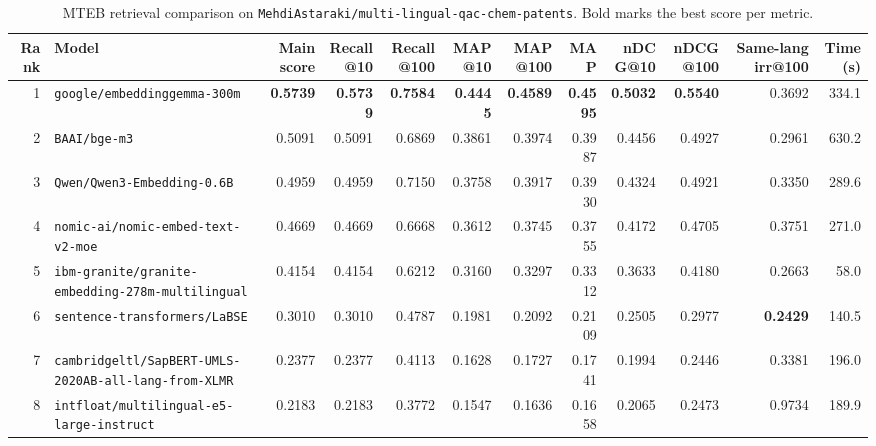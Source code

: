 \begin{table}[t]
\centering
\small
\begin{tabular}{r l r r r r r r r r r r}
\hline
Rank & Model & Main score & Recall@10 & Recall@100 & MAP@10 & MAP@100 & MAP & nDCG@10 & nDCG@100 & Same-lang irr@100 & Time (s) \\
\hline
1 & \texttt{google/embeddinggemma-300m} & \textbf{0.5739} & \textbf{0.5739} & \textbf{0.7584} & \textbf{0.4445} & \textbf{0.4589} & \textbf{0.4595} & \textbf{0.5032} & \textbf{0.5540} & 0.3692 & 334.1 \\
2 & \texttt{BAAI/bge-m3} & 0.5091 & 0.5091 & 0.6869 & 0.3861 & 0.3974 & 0.3987 & 0.4456 & 0.4927 & 0.2961 & 630.2 \\
3 & \texttt{Qwen/Qwen3-Embedding-0.6B} & 0.4959 & 0.4959 & 0.7150 & 0.3758 & 0.3917 & 0.3930 & 0.4324 & 0.4921 & 0.3350 & 289.6 \\
4 & \texttt{nomic-ai/nomic-embed-text-v2-moe} & 0.4669 & 0.4669 & 0.6668 & 0.3612 & 0.3745 & 0.3755 & 0.4172 & 0.4705 & 0.3751 & 271.0 \\
5 & \texttt{ibm-granite/granite-embedding-278m-multilingual} & 0.4154 & 0.4154 & 0.6212 & 0.3160 & 0.3297 & 0.3312 & 0.3633 & 0.4180 & 0.2663 & 58.0 \\
6 & \texttt{sentence-transformers/LaBSE} & 0.3010 & 0.3010 & 0.4787 & 0.1981 & 0.2092 & 0.2109 & 0.2505 & 0.2977 & \textbf{0.2429} & 140.5 \\
7 & \texttt{cambridgeltl/SapBERT-UMLS-2020AB-all-lang-from-XLMR} & 0.2377 & 0.2377 & 0.4113 & 0.1628 & 0.1727 & 0.1741 & 0.1994 & 0.2446 & 0.3381 & 196.0 \\
8 & \texttt{intfloat/multilingual-e5-large-instruct} & 0.2183 & 0.2183 & 0.3772 & 0.1547 & 0.1636 & 0.1658 & 0.2065 & 0.2473 & 0.9734 & 189.9 \\
\hline
\end{tabular}
\caption{MTEB retrieval comparison on \texttt{MehdiAstaraki/multi-lingual-qac-chem-patents}. Bold marks the best score per metric.}
\label{tab:mteb-model-comparison}
\end{table}
